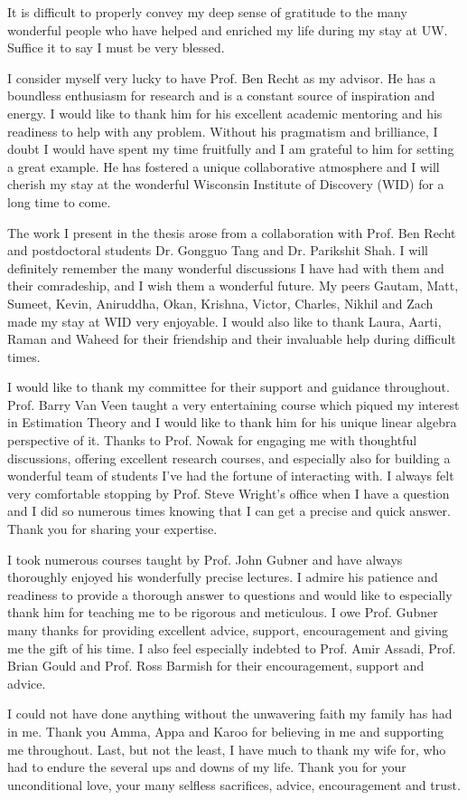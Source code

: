 It is difficult to properly convey my deep sense of gratitude to the many
wonderful people who have helped and enriched my life during my stay at UW. Suffice it to say I must be very blessed.

I consider myself very lucky to have Prof. Ben Recht as my advisor. He has a
boundless enthusiasm for research and is a constant source of inspiration and
energy. I would like to thank him for his excellent academic mentoring and his
readiness to help with any problem. Without his pragmatism and brilliance, I
doubt I would have spent my time fruitfully and I am grateful to him for setting
a great example. He has fostered a unique collaborative atmosphere and I will
cherish my stay at the wonderful Wisconsin Institute of Discovery (WID) for a
long time to come.

The work I present in the thesis arose from a collaboration with Prof. Ben Recht
and postdoctoral students Dr. Gongguo Tang and Dr. Parikshit Shah. I will
definitely remember the many wonderful discussions I have had with them and
their comradeship, and I wish them a wonderful future. My peers Gautam, Matt,
Sumeet, Kevin, Aniruddha, Okan, Krishna, Victor, Charles, Nikhil and Zach made
my stay at WID very enjoyable. I would also like to thank Laura, Aarti, Raman
and Waheed for their friendship and their invaluable help during difficult
times.

I would like to thank my committee for their support and guidance throughout.
Prof. Barry Van Veen taught a very entertaining course which piqued my interest
in Estimation Theory and I would like to thank him for his unique linear algebra
perspective of it. Thanks to Prof. Nowak for engaging me with thoughtful
discussions, offering excellent research courses, and especially also for
building a wonderful team of students I've had the fortune of interacting with.
I always felt very comfortable stopping by Prof. Steve Wright's office when I
have a question and I did so numerous times knowing that I can get a precise and
quick answer. Thank you for sharing your expertise.

I took numerous courses taught by Prof. John Gubner and have always thoroughly
enjoyed his wonderfully precise lectures. I admire his patience and readiness to
provide a thorough answer to questions and would like to especially thank him
for teaching me to be rigorous and meticulous. I owe Prof. Gubner many thanks
for providing excellent advice, support, encouragement and giving me the gift of
his time. I also feel especially indebted to Prof. Amir Assadi, Prof. Brian
Gould and Prof. Ross Barmish for their encouragement, support and advice.

I could not have done anything without the unwavering faith my family has had in
me. Thank you Amma, Appa and Karoo for believing in me and supporting me
throughout. Last, but not the least, I have much to thank my wife for, who had
to endure the several ups and downs of my life. Thank you for your unconditional
love, your many selfless sacrifices, advice, encouragement and trust. 
